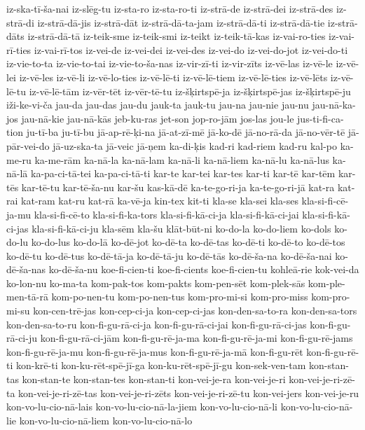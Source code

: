 {iz-ska-tī-ša-nai
iz-slēg-tu
iz-sta-ro
iz-sta-ro-ti
iz-strā-de
iz-strā-dei
iz-strā-des
iz-strā-di
iz-strā-dā-jis
iz-strā-dāt
iz-strā-dā-ta-jam
iz-strā-dā-ti
iz-strā-dā-tie
iz-strā-dāts
iz-strā-dā-tā
iz-teik-sme
iz-teik-smi
iz-teikt
iz-teik-tā-kas
iz-vai-ro-ties
iz-vai-rī-ties
iz-vai-rī-tos
iz-vei-de
iz-vei-dei
iz-vei-des
iz-vei-do
iz-vei-do-jot
iz-vei-do-ti
iz-vie-to-ta
iz-vie-to-tai
iz-vie-to-ša-nas
iz-vir-zī-ti
iz-vir-zīts
iz-vē-las
iz-vē-le
iz-vē-lei
iz-vē-les
iz-vē-li
iz-vē-lo-ties
iz-vē-lē-ti
iz-vē-lē-tiem
iz-vē-lē-ties
iz-vē-lēts
iz-vē-lē-tu
iz-vē-lē-tām
iz-vēr-tēt
iz-vēr-tē-tu
iz-šķirtspē-ja
iz-šķirtspē-jas
iz-šķirtspē-ju
iži-ke-vi-ča
jau-da
jau-das
jau-du
jauk-ta
jauk-tu
jau-na
jau-nie
jau-nu
jau-nā-ka-jos
jau-nā-kie
jau-nā-kās
jeb-ku-ras
jet-son
jop-ro-jām
jos-las
jou-le
jus-ti-fi-ca-tion
ju-tī-ba
ju-tī-bu
jā-ap-rē-ķi-na
jā-at-zī-mē
jā-ko-dē
jā-no-rā-da
jā-no-vēr-tē
jā-pār-vei-do
jā-uz-ska-ta
jā-veic
jā-ņem
ka-di-ķis
kad-ri
kad-riem
kad-ru
kal-po
ka-me-ru
ka-me-rām
ka-nā-la
ka-nā-lam
ka-nā-li
ka-nā-liem
ka-nā-lu
ka-nā-lus
ka-nā-lā
ka-pa-ci-tā-tei
ka-pa-ci-tā-ti
kar-te
kar-tei
kar-tes
kar-ti
kar-tē
kar-tēm
kar-tēs
kar-tē-tu
kar-tē-ša-nu
kar-šu
kas-kā-dē
ka-te-go-ri-ja
ka-te-go-ri-jā
kat-ra
kat-rai
kat-ram
kat-ru
kat-rā
ka-vē-ja
kin-tex
kit-ti
kla-se
kla-sei
kla-ses
kla-si-fi-cē-ja-mu
kla-si-fi-cē-to
kla-si-fi-ka-tors
kla-si-fi-kā-ci-ja
kla-si-fi-kā-ci-jai
kla-si-fi-kā-ci-jas
kla-si-fi-kā-ci-ju
kla-sēm
kla-šu
klāt-būt-ni
ko-do-la
ko-do-liem
ko-dols
ko-do-lu
ko-do-lus
ko-do-lā
ko-dē-jot
ko-dē-ta
ko-dē-tas
ko-dē-ti
ko-dē-to
ko-dē-tos
ko-dē-tu
ko-dē-tus
ko-dē-tā-ja
ko-dē-tā-ju
ko-dē-tās
ko-dē-ša-na
ko-dē-ša-nai
ko-dē-ša-nas
ko-dē-ša-nu
koe-fi-cien-ti
koe-fi-cients
koe-fi-cien-tu
kohleā-rie
kok-vei-da
ko-lon-nu
ko-ma-ta
kom-pak-tos
kom-pakts
kom-pen-sēt
kom-plek-sās
kom-ple-men-tā-rā
kom-po-nen-tu
kom-po-nen-tus
kom-pro-mi-si
kom-pro-miss
kom-pro-mi-su
kon-cen-trē-jas
kon-cep-ci-ja
kon-cep-ci-jas
kon-den-sa-to-ra
kon-den-sa-tors
kon-den-sa-to-ru
kon-fi-gu-rā-ci-ja
kon-fi-gu-rā-ci-jai
kon-fi-gu-rā-ci-jas
kon-fi-gu-rā-ci-ju
kon-fi-gu-rā-ci-jām
kon-fi-gu-rē-ja-ma
kon-fi-gu-rē-ja-mi
kon-fi-gu-rē-jams
kon-fi-gu-rē-ja-mu
kon-fi-gu-rē-ja-mus
kon-fi-gu-rē-ja-mā
kon-fi-gu-rēt
kon-fi-gu-rē-ti
kon-krē-ti
kon-ku-rēt-spē-jī-ga
kon-ku-rēt-spē-jī-gu
kon-sek-ven-tam
kon-stan-tas
kon-stan-te
kon-stan-tes
kon-stan-ti
kon-vei-je-ra
kon-vei-je-ri
kon-vei-je-ri-zē-ta
kon-vei-je-ri-zē-tas
kon-vei-je-ri-zēts
kon-vei-je-ri-zē-tu
kon-vei-jers
kon-vei-je-ru
kon-vo-lu-cio-nā-lais
kon-vo-lu-cio-nā-la-jiem
kon-vo-lu-cio-nā-li
kon-vo-lu-cio-nā-lie
kon-vo-lu-cio-nā-liem
kon-vo-lu-cio-nā-lo
}
